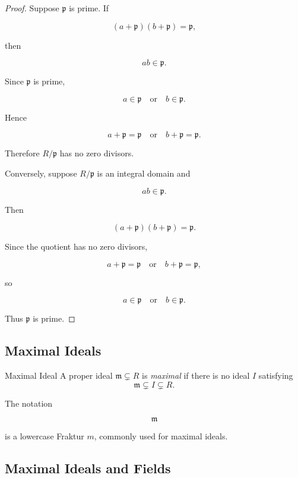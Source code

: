\begin{proof}
Suppose \(\mathfrak p\) is prime. If

\[ (a+\mathfrak p)(b+\mathfrak p)=\mathfrak p, \]

then

\[ ab\in\mathfrak p. \]

Since \(\mathfrak p\) is prime,

\[ a\in\mathfrak p\quad\text{or}\quad b\in\mathfrak p. \]

Hence

\[ a+\mathfrak p=\mathfrak p\quad\text{or}\quad b+\mathfrak p=\mathfrak p. \]

Therefore \(R/\mathfrak p\) has no zero divisors.

Conversely, suppose \(R/\mathfrak p\) is an integral domain and

\[ ab\in\mathfrak p. \]

Then

\[ (a+\mathfrak p)(b+\mathfrak p)=\mathfrak p. \]

Since the quotient has no zero divisors,

\[ a+\mathfrak p=\mathfrak p\quad\text{or}\quad b+\mathfrak p=\mathfrak p, \]

so

\[ a\in\mathfrak p\quad\text{or}\quad b\in\mathfrak p. \]

Thus \(\mathfrak p\) is prime.
\end{proof}

\subsection{Maximal Ideals}
\label{subsec:maximal-ideals}

\begin{definitionbox}{Maximal Ideal}
A proper ideal \(\mathfrak m\subsetneq R\) is \emph{maximal} if there is no
ideal \(I\) satisfying
\[ \mathfrak m\subsetneq I\subsetneq R. \]
\end{definitionbox}

The notation

\[ \mathfrak m \]

is a lowercase Fraktur \(m\), commonly used for maximal ideals.

\subsection{Maximal Ideals and Fields}
\label{subsec:maximal-ideal-field}

